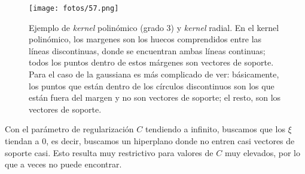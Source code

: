 \begin{figure}[h]
\centering
\texttt{[image: fotos/57.png]}
\caption{Ejemplo de \textit{kernel} polinómico (grado 3) y \textit{kernel} radial. En el kernel polinómico, los margenes son los huecos comprendidos entre las líneas discontinuas, donde se encuentran ambas líneas continuas; todos los puntos dentro de estos márgenes son vectores de soporte. Para el caso de la gaussiana es más complicado de ver: básicamente, los puntos que están dentro de los círculos discontinuos son los que están fuera del margen y no son vectores de soporte; el resto, son los vectores de soporte.}
\label{fig:12.2}
\end{figure}

Con el parámetro de regularización $C$ tendiendo a infinito, buscamos que los $\xi$ tiendan a 0, es decir, buscamos un hiperplano donde no entren casi vectores de soporte casi. Esto resulta muy restrictivo para valores de $C$ muy elevados, por lo que a veces no puede encontrar. 

